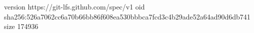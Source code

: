 version https://git-lfs.github.com/spec/v1
oid sha256:526a7062cc6a70b66bb86f608ea530bbbca7fcd3c4b29ade52a64ad90d6db741
size 174936
